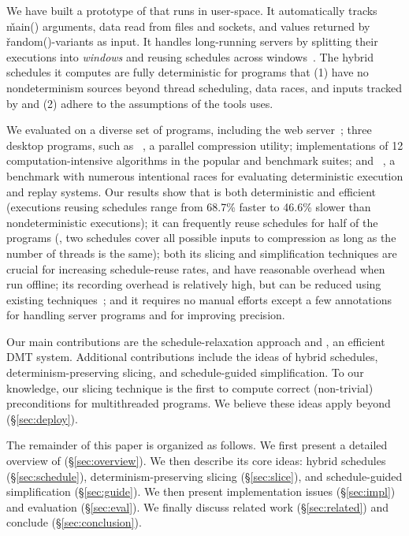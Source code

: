We have built a prototype of \peregrine that runs in user-space.
It automatically tracks \v{main()}
arguments, data read from files and sockets, and values
returned by \v{random()}-variants as input.  It handles long-running servers by
splitting their executions into \emph{windows} and
reusing schedules across windows~\cite{cui:tern:osdi10}.
The hybrid schedules it computes are fully deterministic for programs that
(1) have no nondeterminism sources beyond thread scheduling, data races, and
inputs tracked by \peregrine and (2) adhere to the assumptions of the tools
\peregrine uses.

We evaluated \peregrine on a diverse set of \nprog programs, including the
\apache web server~\cite{apache}; three desktop programs, such as
\pbzip~\cite{pbzip2}, a parallel compression utility; implementations of
12 computation-intensive algorithms in the popular \splash and \parsec
benchmark suites; and \racey~\cite{racy-stress}, a benchmark with numerous
intentional races for evaluating deterministic execution and replay
systems.  Our results show that \peregrine is both deterministic and efficient
(executions reusing schedules range from 68.7\% faster to 46.6\% slower
than nondeterministic executions); it can frequently reuse schedules for
half of the programs (\eg, two schedules cover all possible inputs to
\pbzip compression as long as the number of threads is the same); both its
slicing and
simplification techniques are crucial for increasing schedule-reuse rates,
and have reasonable overhead when run offline; its recording overhead
is relatively high, but can be reduced using existing
techniques~\cite{idna:vee06}; and it requires no manual efforts except a
few annotations for handling server programs and for improving precision.

Our main contributions are the schedule-relaxation approach and \peregrine, an
 efficient DMT system.  Additional contributions include
the ideas of hybrid schedules, determinism-preserving slicing, and
schedule-guided simplification.  To our knowledge, our slicing technique
is the first to compute correct (non-trivial) preconditions for
multithreaded programs.
We believe these ideas apply beyond \peregrine (\S\ref{sec:deploy}).

The remainder of this paper is organized as follows.  We first present a
detailed overview of \peregrine (\S\ref{sec:overview}).  We then describe its
core ideas: hybrid schedules (\S\ref{sec:schedule}),
determinism-preserving slicing (\S\ref{sec:slice}), and schedule-guided
simplification (\S\ref{sec:guide}).  We then present implementation issues
(\S\ref{sec:impl}) and evaluation (\S\ref{sec:eval}).  We finally discuss
related work (\S\ref{sec:related}) and conclude (\S\ref{sec:conclusion}).
